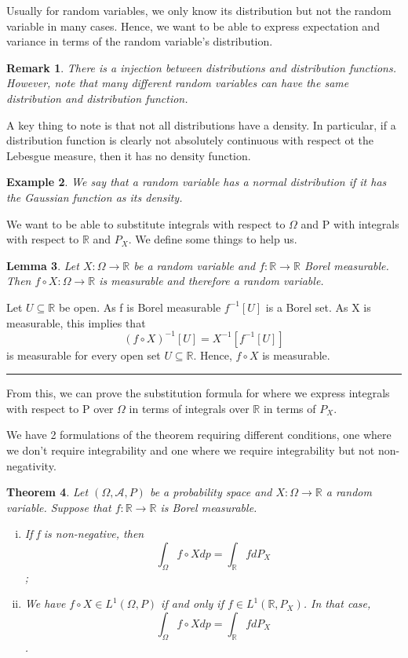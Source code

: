 \documentclass[twoside]{article}
\newcounter{lecnum}
\newtheorem{theorem}{Theorem}[lecnum]
\newtheorem{lemma}[theorem]{Lemma}
\newtheorem{remark}[theorem]{Remark}
\newtheorem{example}[theorem]{Example}
\newenvironment{proof}{{\bf Proof:}}{\hfill\rule{2mm}{2mm}}
\begin{document}
Usually for random variables, we only know its distribution but not the random variable in many cases. Hence, we want to be able to express expectation and variance in terms of the random variable's distribution.

\begin{remark} There is a injection between distributions and distribution functions. However, note that many different random variables can have the same distribution and distribution function. 
\end{remark}

A key thing to note is that not all distributions have a density. In particular, if a distribution function is clearly not absolutely continuous with respect ot the Lebesgue measure, then it has no density function.

\begin{example} We say that a random variable has a normal distribution if it has the Gaussian function as its density.
\end{example}

We want to be able to substitute integrals with respect to $\Omega$ and P with integrals with respect to $\mathbb{R}$ and $P_X$. We define some things to help us.

\begin{lemma} Let $X: \Omega \rightarrow \mathbb{R}$ be a random variable and $f: \mathbb{R} \rightarrow \mathbb{R}$ Borel measurable. Then $f \circ X: \Omega \rightarrow \mathbb{R}$ is measurable and therefore a random variable.
\end{lemma}

\begin{proof} Let $U \subseteq \mathbb{R}$ be open. As f is Borel measurable $f^{-1}[U]$ is a Borel set. As X is measurable, this implies that 
$$
(f \circ X)^{-1}[U] = X^{-1}[f^{-1}[U]]
$$
is measurable for every open set $U \subseteq \mathbb{R}$. Hence, $f \circ X$ is measurable.
\end{proof}

From this, we can prove the substitution formula for where we express integrals with respect to P over $\Omega$ in terms of integrals over $\mathbb{R}$ in terms of $P_X$.

We have 2 formulations of the theorem requiring different conditions, one where we don't require integrability and one where we require integrability but not non-negativity.


\begin{theorem} Let $(\Omega, \mathcal{A}, P)$ be a probability space and $X: \Omega \rightarrow \mathbb{R}$ a random variable. Suppose that $f: \mathbb{R} \rightarrow \mathbb{R}$ is Borel measurable.
\begin{enumerate}[(i)]
    \item If f is non-negative, then $$\int_{\Omega}f \circ X dp = \int_{\mathbb{R}}fdP_X$$;
    \item We have $f \circ X \in L^1(\Omega,P)$ if and only if $f \in L^1(\mathbb{R},P_X)$. In that case, $$\int_{\Omega}f \circ X dp = \int_{\mathbb{R}}fdP_X$$.
\end{enumerate}
\end{theorem}
\end{document}
